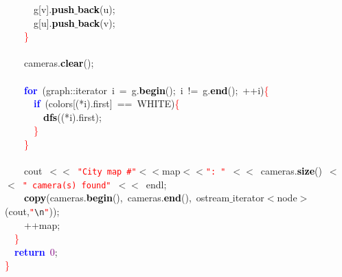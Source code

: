 \mbox{}\ \ \ \ \ \ g\textcolor{BrickRed}{[}v\textcolor{BrickRed}{].}\textbf{\textcolor{Black}{push$\_$back}}\textcolor{BrickRed}{(}u\textcolor{BrickRed}{);} \\
\mbox{}\ \ \ \ \ \ g\textcolor{BrickRed}{[}u\textcolor{BrickRed}{].}\textbf{\textcolor{Black}{push$\_$back}}\textcolor{BrickRed}{(}v\textcolor{BrickRed}{);} \\
\mbox{}\ \ \ \ \textcolor{Red}{\}} \\
\mbox{}\ \ \ \  \\
\mbox{}\ \ \ \ cameras\textcolor{BrickRed}{.}\textbf{\textcolor{Black}{clear}}\textcolor{BrickRed}{();} \\
\mbox{}\ \ \ \  \\
\mbox{}\ \ \ \ \textbf{\textcolor{Blue}{for}}\ \textcolor{BrickRed}{(}graph\textcolor{BrickRed}{::}iterator\ i\ \textcolor{BrickRed}{=}\ g\textcolor{BrickRed}{.}\textbf{\textcolor{Black}{begin}}\textcolor{BrickRed}{();}\ i\ \textcolor{BrickRed}{!=}\ g\textcolor{BrickRed}{.}\textbf{\textcolor{Black}{end}}\textcolor{BrickRed}{();}\ \textcolor{BrickRed}{++}i\textcolor{BrickRed}{)}\textcolor{Red}{\{} \\
\mbox{}\ \ \ \ \ \ \textbf{\textcolor{Blue}{if}}\ \textcolor{BrickRed}{(}colors\textcolor{BrickRed}{[(*}i\textcolor{BrickRed}{).}first\textcolor{BrickRed}{]}\ \textcolor{BrickRed}{==}\ WHITE\textcolor{BrickRed}{)}\textcolor{Red}{\{} \\
\mbox{}\ \ \ \ \ \ \ \ \textbf{\textcolor{Black}{dfs}}\textcolor{BrickRed}{((*}i\textcolor{BrickRed}{).}first\textcolor{BrickRed}{);} \\
\mbox{}\ \ \ \ \ \ \textcolor{Red}{\}} \\
\mbox{}\ \ \ \ \textcolor{Red}{\}} \\
\mbox{}\ \ \ \ \ \  \\
\mbox{}\ \ \ \ cout\ \textcolor{BrickRed}{$<$$<$}\ \texttt{\textcolor{Red}{"{}City\ map\ \#"{}}}\textcolor{BrickRed}{$<$$<$}map\textcolor{BrickRed}{$<$$<$}\texttt{\textcolor{Red}{"{}:\ "{}}}\ \textcolor{BrickRed}{$<$$<$}\ cameras\textcolor{BrickRed}{.}\textbf{\textcolor{Black}{size}}\textcolor{BrickRed}{()}\ \textcolor{BrickRed}{$<$$<$}\ \texttt{\textcolor{Red}{"{}\ camera(s)\ found"{}}}\ \textcolor{BrickRed}{$<$$<$}\ endl\textcolor{BrickRed}{;} \\
\mbox{}\ \ \ \ \textbf{\textcolor{Black}{copy}}\textcolor{BrickRed}{(}cameras\textcolor{BrickRed}{.}\textbf{\textcolor{Black}{begin}}\textcolor{BrickRed}{(),}\ cameras\textcolor{BrickRed}{.}\textbf{\textcolor{Black}{end}}\textcolor{BrickRed}{(),}\ ostream$\_$iterator\textcolor{BrickRed}{$<$}node\textcolor{BrickRed}{$>$(}cout\textcolor{BrickRed}{,}\texttt{\textcolor{Red}{"{}}}\texttt{\textcolor{CarnationPink}{\textbackslash{}n}}\texttt{\textcolor{Red}{"{}}}\textcolor{BrickRed}{));} \\
\mbox{}\ \ \ \ \textcolor{BrickRed}{++}map\textcolor{BrickRed}{;} \\
\mbox{}\ \ \textcolor{Red}{\}} \\
\mbox{}\ \ \textbf{\textcolor{Blue}{return}}\ \textcolor{Purple}{0}\textcolor{BrickRed}{;} \\
\mbox{}\textcolor{Red}{\}} \\

